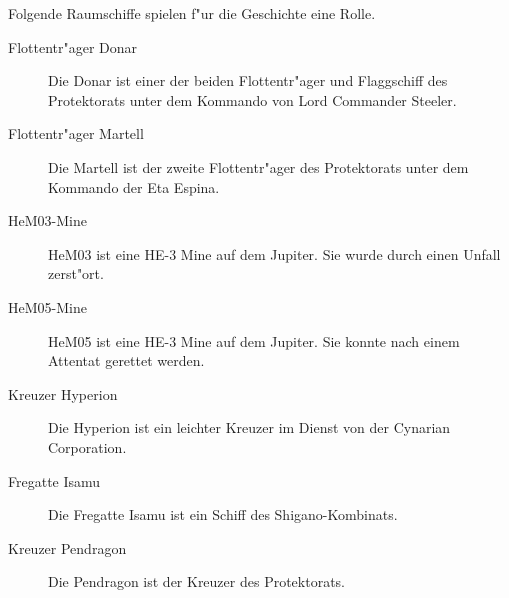 Folgende Raumschiffe spielen f"ur die Geschichte eine Rolle.

\begin{description}
\item [Flottentr"ager Donar] Die Donar ist einer der beiden Flottentr"ager und Flaggschiff des Protektorats unter
      dem Kommando von Lord Commander Steeler.
\item [Flottentr"ager Martell] Die Martell ist der zweite Flottentr"ager des Protektorats unter dem Kommando der Eta Espina.
\item [HeM03-Mine] HeM03 ist eine HE-3 Mine auf dem Jupiter. Sie wurde durch einen Unfall zerst"ort.
\item [HeM05-Mine] HeM05 ist eine HE-3 Mine auf dem Jupiter. Sie konnte nach einem Attentat gerettet werden.
\item [Kreuzer Hyperion] Die Hyperion ist ein leichter Kreuzer im Dienst von der Cynarian Corporation.
\item [Fregatte Isamu] Die Fregatte Isamu ist ein Schiff des Shigano-Kombinats.
\item [Kreuzer Pendragon] Die Pendragon ist der Kreuzer des Protektorats.
\end{description}


